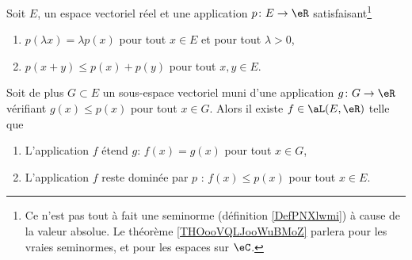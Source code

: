 \begin{theorem}
	Soit \( E\), un espace vectoriel réel et une application \( p\colon E\to \eR\) satisfaisant\footnote{Ce n'est pas tout à fait une seminorme (définition \ref{DefPNXlwmi}) à cause de la valeur absolue. Le théorème \ref{THOooVQLJooWuBMoZ} parlera pour les vraies seminormes, et pour les espaces sur \( \eC\).}
	\begin{enumerate}
		\item
		      \( p(\lambda x)=\lambda p(x)\) pour tout \( x\in E\) et pour tout \( \lambda>0\),
		\item
		      \( p(x+y)\leq p(x)+p(y)\) pour tout \( x,y\in E\).
	\end{enumerate}
	Soit de plus \( G\subset E\) un sous-espace vectoriel muni d'une application \( g\colon G\to \eR\) vérifiant \( g(x)\leq p(x)\) pour tout \( x\in G\). Alors il existe \( f\in\aL(E,\eR)\) telle que
	\begin{enumerate}
		\item
		      L'application \( f\) étend \( g\): \( f(x)=g(x)\) pour tout \( x\in G\),
		\item
		      L'application \( f\) reste dominée par \( p\) : \( f(x)\leq p(x)\) pour tout \( x\in E\).
	\end{enumerate}
\end{theorem}

